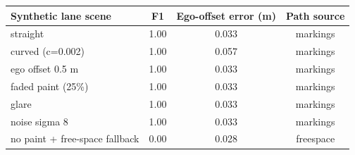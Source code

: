 \begin{tabular}{@{}lccc@{}}
\toprule
Synthetic lane scene & F1 & Ego-offset error (m) & Path source \\
\midrule
straight & 1.00 & 0.033 & markings \\
curved (c=0.002) & 1.00 & 0.057 & markings \\
ego offset 0.5 m & 1.00 & 0.033 & markings \\
faded paint (25\%) & 1.00 & 0.033 & markings \\
glare & 1.00 & 0.033 & markings \\
noise sigma 8 & 1.00 & 0.033 & markings \\
no paint + free-space fallback & 0.00 & 0.028 & freespace \\
\bottomrule
\end{tabular}
